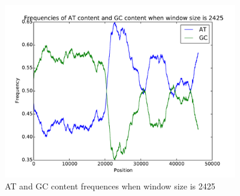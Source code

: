 \documentclass{acm_proc_article-sp}
\begin{document}
\begin{figure}[t]
	\includegraphics[width=4in]{dinuc-window-2425.pdf}
	\caption{AT and GC content frequences when window size is 2425}
	\label{fig:dn2425}
\end{figure}




%


%
%

\balancecolumns
\end{document}
